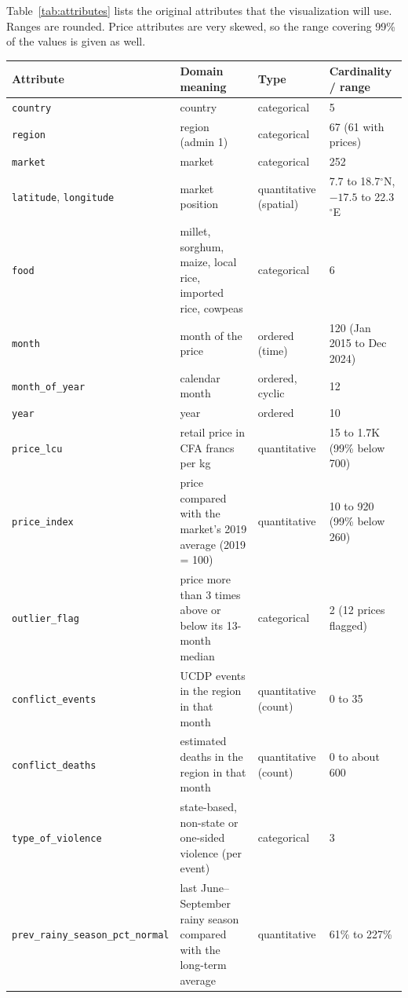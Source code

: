 \documentclass{article}
\begin{document}
Table~\ref{tab:attributes} lists the original attributes that the visualization will use. Ranges are rounded. Price attributes are very skewed, so the range covering 99\% of the values is given as well.

\begin{table}[H]
  \centering
  \small
  \begin{tabularx}{\linewidth}{l X l X}
    \hline
    \textbf{Attribute} & \textbf{Domain meaning} & \textbf{Type} & \textbf{Cardinality / range} \\
    \hline
    \texttt{country} & country & categorical & 5 \\
    \texttt{region} & region (admin 1) & categorical & 67 (61 with prices) \\
    \texttt{market} & market & categorical & 252 \\
    \texttt{latitude}, \texttt{longitude} & market position & quantitative (spatial) & 7.7 to 18.7$^\circ$N, $-17.5$ to 22.3$^\circ$E \\
    \texttt{food} & millet, sorghum, maize, local rice, imported rice, cowpeas & categorical & 6 \\
    \texttt{month} & month of the price & ordered (time) & 120 (Jan 2015 to Dec 2024) \\
    \texttt{month\_of\_year} & calendar month & ordered, cyclic & 12 \\
    \texttt{year} & year & ordered & 10 \\
    \texttt{price\_lcu} & retail price in CFA francs per kg & quantitative & 15 to 1.7K (99\% below 700) \\
    \texttt{price\_index} & price compared with the market's 2019 average (2019 = 100) & quantitative & 10 to 920 (99\% below 260) \\
    \texttt{outlier\_flag} & price more than 3 times above or below its 13-month median & categorical & 2 (12 prices flagged) \\
    \texttt{conflict\_events} & UCDP events in the region in that month & quantitative (count) & 0 to 35 \\
    \texttt{conflict\_deaths} & estimated deaths in the region in that month & quantitative (count) & 0 to about 600 \\
    \texttt{type\_of\_violence} & state-based, non-state or one-sided violence (per event) & categorical & 3 \\
    \texttt{prev\_rainy\_season\_pct\_normal} & last June--September rainy season compared with the long-term average & quantitative & 61\% to 227\% \\

\end{tabularx}
\end{table}
\end{document}
